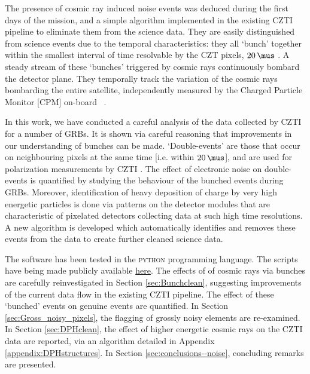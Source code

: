 The presence of cosmic ray induced noise events was deduced during the first days of the mission, and a simple algorithm implemented in the existing CZTI pipeline to eliminate them from the science data. They are easily distinguished from science events due to the temporal characteristics: they all `bunch' together within the smallest interval of time resolvable by the CZT pixels, $20 \, \mus$ \citep{Bhalerao_et_al.-2017-JApA}. A steady stream of these `bunches' triggered by cosmic rays continuously bombard the detector plane. They temporally track the variation of the cosmic rays bombarding the entire satellite, independently measured by the Charged Particle Monitor [CPM] on-board \AS\ \citep{Rao_et_al.-2017-JApA}.

In this work, we have conducted a careful analysis of the data collected by CZTI for a number of GRBs. It is shown via careful reasoning that improvements in our understanding of bunches can be made. `Double-events' are those that occur on neighbouring pixels at the same time [i.e. within $20 \, \mus$], and are used for polarization measurements by CZTI \citep{Chattopadhyay_et_al.-2014-ExA, Chattopadhyay_et_al.-2017-arXiv}. The effect of electronic noise on double-events is quantified by studying the behaviour of the bunched events during GRBs. Moreover, identification of heavy deposition of charge by very high energetic particles is done via patterns on the detector modules that are characteristic of pixelated detectors collecting data at such high time resolutions. A new algorithm is developed which automatically identifies and removes these events from the data to create further cleaned science data.

The software has been tested in the \textsc{python} programming language. The scripts have being made publicly available \href{https://github.com/DebduttaPaul/useful_functions_for_CZTI_data_analysis}{here}. The effects of of cosmic rays via bunches are carefully reinvestigated in Section \ref{sec:Bunchclean}, suggesting improvements of the current data flow in the existing CZTI pipeline. The effect of these `bunched' events on genuine events are quantified. In Section \ref{sec:Gross_noisy_pixels}, the flagging of grossly noisy elements are re-examined. In Section \ref{sec:DPHclean}, the effect of higher energetic cosmic rays on the CZTI data are reported, via an algorithm detailed in Appendix \ref{appendix:DPHstructures}. In Section \ref{sec:conclusions--noise}, concluding remarks are presented.



